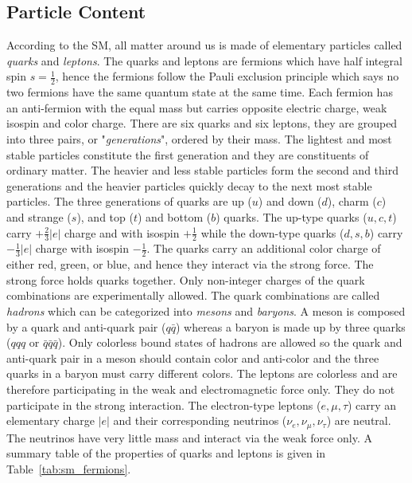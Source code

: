 \subsection{Particle Content}
\label{subsec:sm_particle_content}
According to the SM, all matter around us is made of elementary particles called \textit{quarks} and \textit{leptons}.
The quarks and leptons are fermions which have half integral spin $s=\frac{1}{2}$, hence the fermions follow the Pauli exclusion principle which says no two fermions have the same quantum state at the same time.
Each fermion has an anti-fermion with the equal mass but carries opposite electric charge, weak isospin and color charge.
There are six quarks and six leptons, they are grouped into three pairs, or "\textit{generations}", ordered by their mass.
The lightest and most stable particles constitute the first generation and they are constituents of ordinary matter.
The heavier and less stable particles form the second and third generations and the heavier particles quickly decay to the next most stable particles.
The three generations of quarks are up ($u$) and down ($d$), charm ($c$) and strange ($s$), and top ($t$) and bottom ($b$) quarks.
The up-type quarks ($u, c, t$) carry $+\frac{2}{3}|e|$ charge and with isospin $+\frac{1}{2}$ while the down-type quarks ($d, s, b$) carry $-\frac{1}{3}|e|$ charge with isospin $-\frac{1}{2}$.
The quarks carry an additional color charge of either red, green, or blue, and hence they interact via the strong force.
The strong force holds quarks together.
Only non-integer charges of the quark combinations are experimentally allowed.
The quark combinations are called \textit{hadrons} which can be categorized into \textit{mesons} and \textit{baryons}.
A meson is composed by a quark and anti-quark pair ($q\bar{q}$) whereas a baryon is made up by three quarks ($qqq$ or $\bar{q}\bar{q}\bar{q}$).
Only colorless bound states of hadrons are allowed so the quark and anti-quark pair in a meson should contain color and anti-color and the three quarks in a baryon must carry different colors.
The leptons are colorless and are therefore participating in the weak and electromagnetic force only. 
They do not participate in the strong interaction.
The electron-type leptons ($e, \mu, \tau$) carry an elementary charge $|e|$ and their corresponding neutrinos ($\nu_{e}, \nu_{\mu}, \nu_{\tau}$) are neutral.
The neutrinos have very little mass and interact via the weak force only.
A summary table of the properties of quarks and leptons is given in Table~\ref{tab:sm_fermions}.

